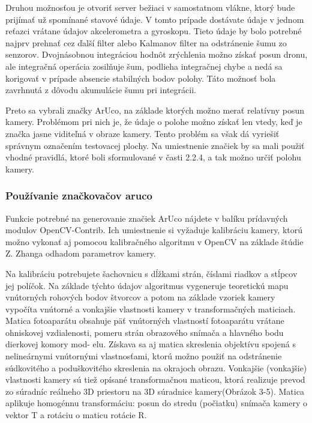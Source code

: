 {Druhou možnosťou je otvoriť server bežiaci v samostatnom vlákne, ktorý bude prijímať už spomínané stavové údaje. V tomto prípade dostávate údaje v jednom reťazci vrátane údajov akcelerometra a gyroskopu. Tieto údaje by bolo potrebné najprv prehnať cez ďalší filter \citep{7859621} alebo Kalmanov filter \citep{8839496} na odstránenie šumu zo senzorov. Dvojnásobnou integráciou hodnôt zrýchlenia možno získať posun dronu, ale integračná operácia zosilňuje šum, podlieha integračnej chybe a nedá sa korigovať v prípade absencie stabilných bodov polohy. Táto možnosť bola zavrhnutá z dôvodu akumulácie šumu pri integrácii. 

Preto sa vybrali značky ArUco, na základe ktorých možno merať relatívny posun kamery. Problémom pri nich je, že údaje o polohe možno získať len vtedy, keď je značka jasne viditeľná v obraze kamery. Tento problém sa však dá vyriešiť správnym označením testovacej plochy. Na umiestnenie značiek by sa mali použiť vhodné pravidlá, ktoré boli sformulované v časti 2.2.4, a tak možno určiť polohu kamery. 

\subsubsection{Používanie značkovačov aruco}
Funkcie potrebné na generovanie značiek ArUco nájdete v balíku prídavných modulov OpenCV-Contrib. Ich umiestnenie si vyžaduje kalibráciu kamery, ktorú možno vykonať aj pomocou kalibračného algoritmu v OpenCV na základe štúdie Z. Zhanga \citep{888718} odhadom parametrov kamery. 

Na kalibráciu potrebujete šachovnicu s dĺžkami strán, číslami riadkov a stĺpcov jej políčok. Na základe týchto údajov algoritmus vygeneruje teoretickú mapu vnútorných rohových bodov štvorcov a potom na základe vzoriek kamery vypočíta vnútorné a vonkajšie vlastnosti kamery v transformačných maticiach. Matica fotoaparátu obsahuje päť vnútorných vlastností fotoaparátu vrátane ohniskovej vzdialenosti, pomeru strán obrazového snímača a hlavného bodu dierkovej komory mod- elu. Získava sa aj matica skreslenia objektívu spojená s nelineárnymi vnútornými vlastnosťami, ktorú možno použiť na odstránenie súdkovitého a poduškovitého skreslenia na okrajoch obrazu. Vonkajšie (vonkajšie) vlastnosti kamery sú tiež opísané transformačnou maticou, ktorá realizuje prevod zo súradníc reálneho 3D priestoru na 3D súradnice kamery(Obrázok 3-5). Matica aplikuje homogénnu transformáciu: posun do stredu (počiatku) snímača kamery o vektor T a rotáciu o maticu rotácie R. 

}
